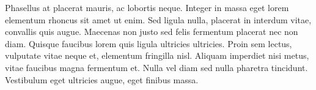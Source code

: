 Phasellus at placerat mauris, ac lobortis neque. Integer in massa eget lorem elementum rhoncus sit amet ut enim. Sed ligula nulla, placerat in interdum vitae, convallis quis augue. Maecenas non justo sed felis fermentum placerat nec non diam. Quisque faucibus lorem quis ligula ultricies ultricies. Proin sem lectus, vulputate vitae neque et, elementum fringilla nisl. Aliquam imperdiet nisi metus, vitae faucibus magna fermentum et. Nulla vel diam sed nulla pharetra tincidunt. Vestibulum eget ultricies augue, eget finibus massa. 



